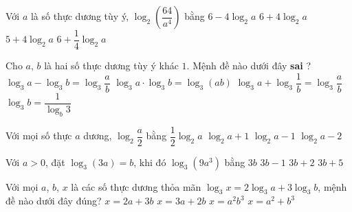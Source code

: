 \begin{ex}%
	Với $ a$ là  số thực dương tùy ý, $\log_2\left(\dfrac{64}{a^4}\right)$ bằng
	\choice 
		{\True $  6-4\log_2a$}
		{$ 6+4\log_2a$} 
		 {$ 5+4\log_2a$}
		 {$ 6+\dfrac{1}{4}\log_2a$}
\end{ex}

\begin{ex}%
	Cho $a$, $b$ là  hai số thực dương tùy ý khác $1$. Mệnh đề nào dưới đây \textbf{sai} ?
	 \choice
		{$\log_3 a-\log_3 b=\log_3 \dfrac{a}{b}$} 
		{\True $\log_3 a \cdot  \log_3 b=\log_3(a b)$}
		 {$\log_3 a+\log_3 \dfrac{1}{b}=\log_3 \dfrac{a}{b}$}
		 {$\log_3 b=\dfrac{1}{\log_b 3}$}
\end{ex}

\begin{ex}%
	Với  mọi số thực $a$ dương, $\log_2 \dfrac{a}{2}$ bằng
	\choice 
		{$\dfrac{1}{2} \log_2 a$} 
		{$\log_2 a+1$} 
		{\True$\log_2  a-1$}
		{$\log_2 a-2$} 
\end{ex}

\begin{ex}%
	[MĐ 103 2020-2021 - ĐỢT 2] Với $a>0$, đặt $\log_3(3a)=b$, khi đó $\log_3\left(9a^3\right)$  bằng
	\choice 
		{$3b$} 
		{\True $3b-1$} 
		 {$3b+2$}
		 {$3b+5$}
\end{ex}

\begin{ex}%
	Với mọi $a$, $b$, $x$ là các số thực dương thỏa mãn $\log _3 x=2 \log _3 a+3 \log _3 b$, mệnh đề nào dưới  đây đúng?
	 \choice
		{$x=2 a+3  b$}
		{$x=3 a+2  b$}
		{$x=a^2  b^3$}
		{\True $x=a^2+b^3$} 
\end{ex}

